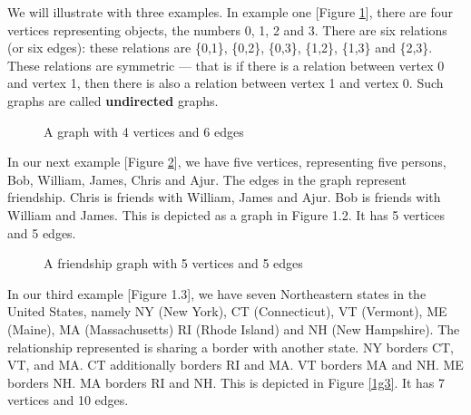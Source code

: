 We will illustrate with three examples. In example one [Figure \ref{1g1}], there are four vertices representing objects, the numbers 0, 1, 2 and 3. There are six relations (or six edges): these relations are \{0,1\}, \{0,2\}, \{0,3\}, \{1,2\}, \{1,3\} and \{2,3\}. These relations are symmetric --- that is if there is a relation between vertex 0 and vertex 1, then there is also a relation between vertex 1 and vertex 0. Such graphs are called \textbf{undirected} graphs.
\begin{figure}
\begin{center}
\caption{A graph with 4 vertices and 6 edges}\label{1g1}
\end{center}
\end{figure}
\begin{newpage}
\end{newpage}

In our next example [Figure \ref{1g2}], we have five vertices, representing five persons, Bob, William, James, Chris and Ajur. The edges in the graph represent friendship. Chris is friends with William, James and Ajur. Bob is friends with William and James. This is depicted as a graph in Figure 1.2. It has 5 vertices and 5 edges.
\begin{figure}
\begin{center}
\caption{A friendship graph with 5 vertices and 5 edges}\label{1g2}
\end{center}
\end{figure}
\begin{newpage}
\end{newpage}
In our third example [Figure 1.3], we have seven Northeastern states in the United States, namely NY (New York), CT (Connecticut), VT (Vermont), ME (Maine), MA (Massachusetts) RI (Rhode Island) and NH (New Hampshire). The relationship represented is sharing a border with another state. NY borders CT, VT, and MA. CT additionally borders RI and MA. VT borders MA and NH. ME borders NH. MA borders RI and NH. This is depicted in Figure \ref{1g3}. It has 7 vertices and 10 edges.

